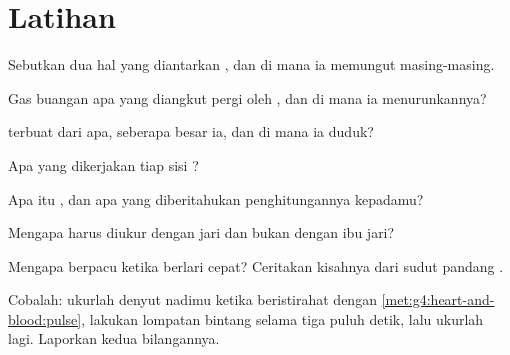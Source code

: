 \section{Latihan}

\begin{exercise}[$\star$]\label{exo:g4:heart-and-blood:1}
Sebutkan dua hal yang diantarkan , dan di mana ia memungut
masing-masing.
\end{exercise}

\begin{exercise}[$\star$]\label{exo:g4:heart-and-blood:2}
Gas buangan apa yang diangkut pergi oleh , dan di mana ia
menurunkannya?
\end{exercise}

\begin{exercise}[$\star$]\label{exo:g4:heart-and-blood:3}
 terbuat dari apa, seberapa besar ia, dan di mana ia duduk?
\end{exercise}

\begin{exercise}[$\star$]\label{exo:g4:heart-and-blood:4}
Apa yang dikerjakan tiap sisi ?
\end{exercise}

\begin{exercise}[$\star$]\label{exo:g4:heart-and-blood:5}
Apa itu , dan apa yang diberitahukan penghitungannya
kepadamu?
\end{exercise}

\begin{exercise}[$\star$]\label{exo:g4:heart-and-blood:6}
Mengapa  harus diukur dengan jari dan bukan dengan ibu
jari?
\end{exercise}

\begin{exercise}[$\star$]\label{exo:g4:heart-and-blood:7}
Mengapa  berpacu ketika berlari cepat? Ceritakan kisahnya
dari sudut pandang  .
\end{exercise}

\begin{exercise}[$\star$]\label{exo:g4:heart-and-blood:8}
Cobalah: ukurlah denyut nadimu ketika beristirahat dengan
\cref{met:g4:heart-and-blood:pulse}, lakukan lompatan bintang selama
tiga puluh detik, lalu ukurlah lagi. Laporkan kedua bilangannya.
\end{exercise}

